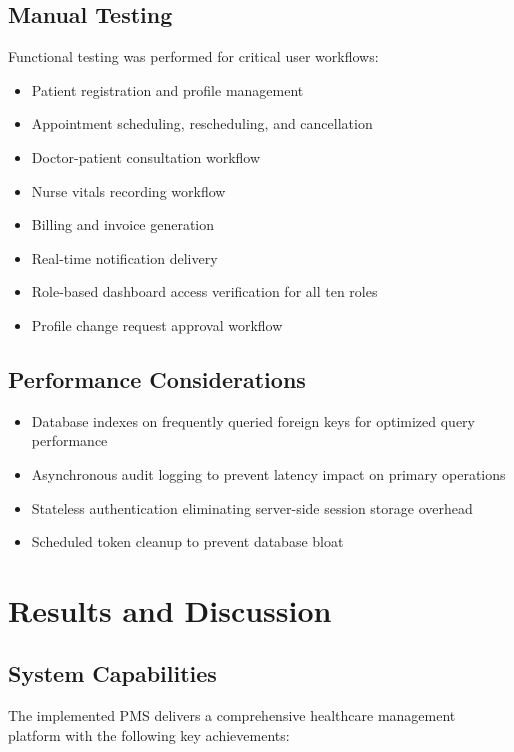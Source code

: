 \documentclass[conference]{IEEEtran}
\begin{document}
\subsection{Manual Testing}
Functional testing was performed for critical user workflows:
\begin{itemize}[leftmargin=*]
  \item Patient registration and profile management
  \item Appointment scheduling, rescheduling, and cancellation
  \item Doctor-patient consultation workflow
  \item Nurse vitals recording workflow
  \item Billing and invoice generation
  \item Real-time notification delivery
  \item Role-based dashboard access verification for all ten roles
  \item Profile change request approval workflow
\end{itemize}

\subsection{Performance Considerations}
\begin{itemize}[leftmargin=*]
  \item Database indexes on frequently queried foreign keys for optimized query performance
  \item Asynchronous audit logging to prevent latency impact on primary operations
  \item Stateless authentication eliminating server-side session storage overhead
  \item Scheduled token cleanup to prevent database bloat
\end{itemize}

\section{Results and Discussion}

\subsection{System Capabilities}
The implemented PMS delivers a comprehensive healthcare management platform with the following key achievements:
\end{document}
